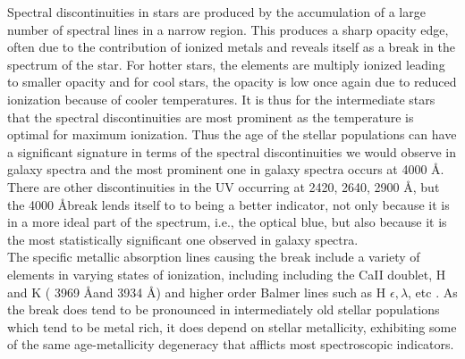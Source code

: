 Spectral discontinuities in stars are produced by the accumulation of a large number of spectral lines in a narrow region. This produces a sharp opacity edge, often due to the contribution of ionized metals and reveals itself as a break in the spectrum of the star. For hotter stars, the elements are multiply ionized leading to smaller opacity and for cool stars, the opacity is low once again due to reduced ionization because of cooler temperatures. It is thus for the intermediate stars that the spectral discontinuities are most prominent as the temperature is optimal for maximum ionization. Thus the age of the stellar populations can have a significant signature in terms of the spectral discontinuities we would observe in galaxy spectra and the most prominent one in galaxy spectra occurs at 4000 \AA \citep{bruzual1981, bruzual_a._spectral_1983}. There are other discontinuities in the UV occurring at 2420, 2640, 2900 \AA, but the 4000 \AA break lends itself to to being a better indicator, not only because it is in a more ideal part of the spectrum, i.e., the optical blue, but also because it is the most statistically significant one observed in galaxy spectra.\\

The specific metallic absorption lines causing the break include a variety of elements in varying states of ionization, including including the CaII doublet, H and K ( 3969 \AA and 3934 \AA) and higher order Balmer lines such as H $\epsilon, \lambda$, etc \citep{hamilton1985}. As the break does tend to be pronounced in intermediately old stellar populations which tend to be metal rich, it does depend on stellar metallicity, exhibiting some of the same age-metallicity degeneracy that afflicts most spectroscopic indicators.\\ 



